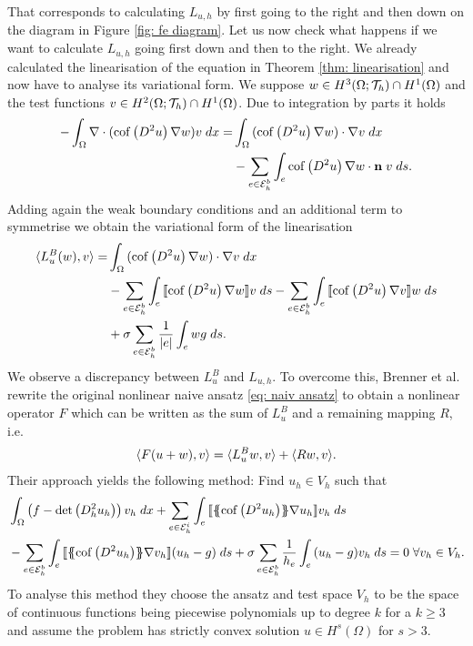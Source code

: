 That corresponds to calculating $L_{u,h}$ by first going to the right and then down on the diagram in Figure \ref{fig: fe diagram}. Let us now check what happens if we want to calculate $L_{u,h}$ going first down and then to the right.
We already calculated the linearisation of the \MA equation in Theorem \ref{thm: linearisation} and now have to analyse its variational form. We suppose $w \in H^3(\Omega; \mathcal{T}_h) \cap H^1(\Omega)$ and the test functions $v \in H^2(\Omega; \mathcal{T}_h) \cap H^1(\Omega)$. Due to integration by parts it holds
\begin{align*}
  -\int_{\Omega} {{ \nabla \cdot (\operatorname{cof} \left( D^2 u \right) \nabla w) v}\;dx}
  	=& \int_{\Omega} {{ (\operatorname{cof} \left( D^2 u \right) \nabla w) \cdot \nabla v}\;dx} \\
  	 &	- \sum_{e \in \mathcal{E}_h^b} \int_{e} {{ \operatorname{cof} \left( D^2 u \right) \nabla w \cdot \mathbf n \; v}\;ds}.
\end{align*}
Adding again the weak boundary conditions and an additional term to symmetrise we obtain the variational form of the linearisation
\begin{align}
	\langle L^B_{u}(w),v\rangle 
	    =& \int_{\Omega} {{(\operatorname{cof} \left( D^2 u \right) \nabla w) \cdot \nabla v}\;dx} \nonumber \\
	    	&- \sum_{e \in \mathcal{E}_h^b} \int_{e} {{ \llbracket  \operatorname{cof} \left( D^2 u \right) \nabla w \rrbracket v}\;ds} 
	    	- \sum_{e \in \mathcal{E}_h^b} \int_{e} {{ \llbracket \operatorname{cof} \left( D^2 u \right) \nabla v \rrbracket w}\;ds} \nonumber \\
	    	& + \sigma \sum_{e \in \mathcal{E}_h^b} \frac 1 {|e|} \int_{e} {{{w}{g}}\;ds}. \label{eq: var of linearisation}
\end{align}
We observe a discrepancy between $L^B_{u}$ and $L_{u,h}$. To overcome this, Brenner et al. rewrite the original nonlinear naive ansatz \eqref{eq: naiv ansatz} to obtain a nonlinear operator $F$ which can be written as the sum of $L^B_{u}$ and a remaining mapping $R$, i.e.
\begin{align}
	 \langle F (u+w), v \rangle =  \langle L^B_{u}w, v \rangle +  \langle Rw, v \rangle. \label{eq: brenner entwicklung}
\end{align}
Their approach yields the following method: Find $u_h \in V_h$ such that
\begin{align}
\begin{split}
	&\myIntX {\Omega} {\left(f-\mydet {D^2_h u_h}\right) v_h} 
	+ \sum_{e \in \edgesi} \myIntS e { \jump{ \average{\mycof{D^2 u_h} } \nabla u_h } v_h} \\
	&- \sum_{e \in \edgesb} \myIntS e { \jump{ \average{\mycof{D^2 u_h} } \nabla v_h } (u_h -g)} 
	+ \sigma  \sum_{e \in \edgesb} \frac 1 {h_e} \myIntS e { (u_h -g)v_h}  = 0 \; \forall v_h \in V_h. \label{eq: brenner method}
\end{split}
\end{align}
To analyse this method they choose the ansatz and test space $V_h$ to be the space of continuous functions being piecewise polynomials up to degree $k$ for a $k \geq 3$ and assume the \MA problem has strictly convex solution $u\in H^s(\Omega)$ for $s>3$. %

